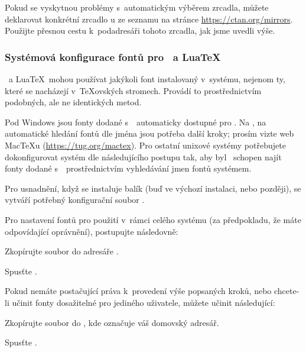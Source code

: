 \documentclass[\classoptions,slovak,english,czech]{\classname}
\begin{document}
Pokud se vyskytnou problémy s~automatickým výběrem zrcadla, 
můžete deklarovat konkrétní zrcadlo \CTAN{}u ze seznamu na stránce
\url{https://ctan.org/mirrors}. Použijte přesnou cestu k~podadresáři 
 tohoto zrcadla, jak jsme uvedli výše.

\subsubsection{Systémová konfigurace fontů pro \protect\XeTeX\protect\ a Lua\protect\TeX}
\label{sec:font-conf-sys}

\XeTeX\ a Lua\TeX\ mohou používat jakýkoli font instalovaný 
v~systému, nejenom ty, které se nacházejí
v~\TeX{}ovských stromech. Provádí to prostřednictvím 
podobných, ale ne identických metod.

Pod Windows jsou fonty dodané s~\TL\ automaticky
dostupné pro \XeTeX.
Na \MacOSX, na automatické hledání fontů dle jména
jsou potřeba další kroky; prosím vizte web Mac\TeX u
(\url{https://tug.org/mactex}). 
Pro ostatní unixové systémy potřebujete dokonfigurovat 
systém dle následujícího postupu tak, aby byl \XeTeX\ 
schopen najít fonty dodané s~\TL\ 
prostřednictvím vyhledávání jmen fontů systémem.

Pro usnadnění, když se instaluje balík  
(buď ve výchozí instalaci, nebo později), 
se vytváří potřebný konfigurační soubor 
.

Pro nastavení fontů \TL{} pro použití v~rámci 
celého systému (za předpokladu, že máte odpovídající oprávnění), 
postupujte následovně:
\begin{enumerate*}
\item Zkopírujte soubor  do adresáře
.
\item Spusťte \Ucom{fc-cache -fsv}.
\end{enumerate*}
Pokud nemáte postačující práva k~provedení výše popsaných kroků,
nebo chcete-li učinit fonty \TL{} dosažitelné pro jediného uživatele, 
můžete učinit následující:
\begin{enumerate*}
\item Zkopírujte soubor  do
  , kde \filename{~} označuje váš 
  domovský adresář.
\item Spusťte \Ucom{fc-cache -fv}.
\end{enumerate*}
\end{document}
